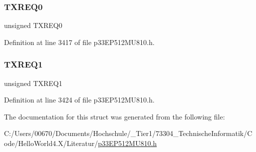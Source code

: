 \mbox{\label{structtag_c1_t_r01_c_o_n_b_i_t_s_af1df88e53ab7e28b18741e1a0a1fbcd7}} 
\subsubsection{\texorpdfstring{T\+X\+R\+E\+Q0}{TXREQ0}}
{\footnotesize\ttfamily unsigned T\+X\+R\+E\+Q0}



Definition at line 3417 of file p33\+E\+P512\+M\+U810.\+h.

\mbox{\label{structtag_c1_t_r01_c_o_n_b_i_t_s_a68518d5d2618c8ec06a28b757b066c17}} 
\subsubsection{\texorpdfstring{T\+X\+R\+E\+Q1}{TXREQ1}}
{\footnotesize\ttfamily unsigned T\+X\+R\+E\+Q1}



Definition at line 3424 of file p33\+E\+P512\+M\+U810.\+h.



The documentation for this struct was generated from the following file\+:\begin{DoxyCompactItemize}
\item 
C\+:/\+Users/00670/\+Documents/\+Hochschule/\+\_\+\+Tier1/73304\+\_\+\+Technische\+Informatik/\+Code/\+Hello\+World4.\+X/\+Literatur/\hyperlink{p33_e_p512_m_u810_8h}{p33\+E\+P512\+M\+U810.\+h}\end{DoxyCompactItemize}
